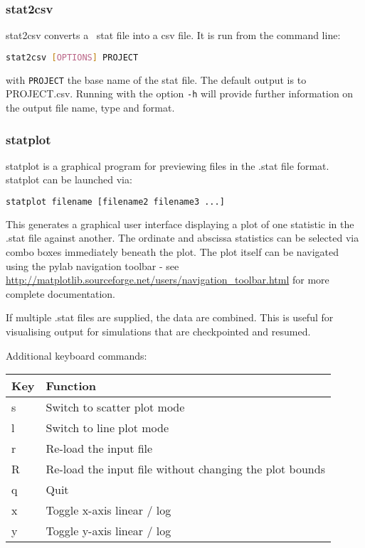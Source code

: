 
\subsubsection{stat2csv}
\label{sec:stat2csv}
stat2csv converts a \fluidity\ stat file into a csv file. It is run from the command line:
\begin{lstlisting}[language = Bash]
stat2csv [OPTIONS] PROJECT
\end{lstlisting} 
with \lstinline[language = Bash]+PROJECT+ the base name of the stat file. The default output is to PROJECT.csv. Running with the option \lstinline[language = Bash]+-h+ will provide further information on the output file name, type and format.


\subsubsection{statplot}
\label{sec:statplot}

statplot is a graphical program for previewing files in the .stat file format.
statplot can be launched via:

\begin{lstlisting}[language = Bash]
statplot filename [filename2 filename3 ...]
\end{lstlisting}

This generates a graphical user interface displaying a plot of one statistic in
the .stat file against another. The ordinate and abscissa statistics can be
selected via combo boxes immediately beneath the plot. The plot itself can
be navigated using the pylab navigation toolbar - see
\url{http://matplotlib.sourceforge.net/users/navigation_toolbar.html} for
more complete documentation.

If multiple .stat files are supplied, the data are combined. This is useful for
visualising output for simulations that are checkpointed and resumed. 

Additional keyboard commands:

\begin{center}
  \begin{tabular}{| l | l |}
    \hline
    Key & Function \\
    \hline
    s   & Switch to scatter plot mode \\
    l   & Switch to line plot mode \\
    r   & Re-load the input file \\
    R   & Re-load the input file without changing the plot bounds \\
    q   & Quit \\
    x   & Toggle x-axis linear / log \\
    y   & Toggle y-axis linear / log \\
    \hline
  \end{tabular}
\end{center}


